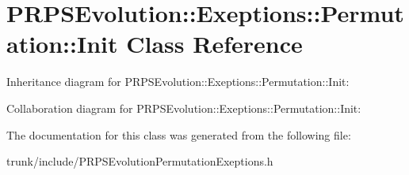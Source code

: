 \hypertarget{class_p_r_p_s_evolution_1_1_exeptions_1_1_permutation_1_1_init}{\section{P\-R\-P\-S\-Evolution\-:\-:Exeptions\-:\-:Permutation\-:\-:Init Class Reference}
\label{class_p_r_p_s_evolution_1_1_exeptions_1_1_permutation_1_1_init}
}


Inheritance diagram for P\-R\-P\-S\-Evolution\-:\-:Exeptions\-:\-:Permutation\-:\-:Init\-:


Collaboration diagram for P\-R\-P\-S\-Evolution\-:\-:Exeptions\-:\-:Permutation\-:\-:Init\-:


The documentation for this class was generated from the following file\-:\begin{DoxyCompactItemize}
\item 
trunk/include/P\-R\-P\-S\-Evolution\-Permutation\-Exeptions.\-h\end{DoxyCompactItemize}
